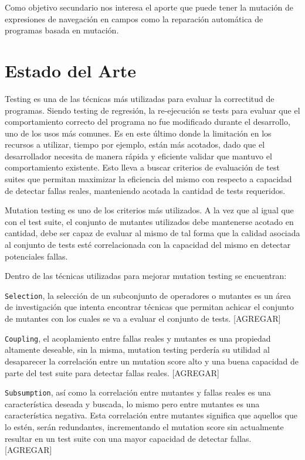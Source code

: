 Como objetivo secundario nos interesa el aporte que puede tener la mutaci\'on de expresiones de navegaci\'on en campos como la reparaci\'on autom\'atica de programas basada en mutaci\'on.


\section{Estado del Arte}
\label{sec:intro.estado-del-arte}

Testing es una de las t\'ecnicas m\'as utilizadas para evaluar la correctitud de programas. Siendo testing de regresi\'on, la re-ejecuci\'on se tests para evaluar que el comportamiento correcto del programa no fue modificado durante el desarrollo, uno de los usos m\'as comunes. Es en este \'ultimo donde la limitaci\'on en los recursos a utilizar, tiempo por ejemplo, est\'an m\'as acotados, dado que el desarrollador necesita de manera r\'apida y eficiente validar que mantuvo el comportamiento existente. Esto lleva a buscar criterios de evaluaci\'on de test suites que permitan maximizar la eficiencia del mismo con respecto a capacidad de detectar fallas reales, manteniendo acotada la cantidad de tests requeridos.

Mutation testing es uno de los criterios m\'as utilizados. A la vez que al igual que con el test suite, el conjunto de mutantes utilizados debe mantenerse acotado en cantidad, debe ser capaz de evaluar al mismo de tal forma que la calidad asociada al conjunto de tests est\'e correlacionada con la capacidad del mismo en detectar potenciales fallas.

Dentro de las t\'ecnicas utilizadas para mejorar mutation testing se encuentran:

\texttt{Selection}, la selecci\'on de un subconjunto de operadores o mutantes es un \'area de investigaci\'on que intenta encontrar t\'ecnicas que permitan achicar el conjunto de mutantes con los cuales se va a evaluar el conjunto de tests. [AGREGAR]

\texttt{Coupling}, el acoplamiento entre fallas reales y mutantes es una propiedad altamente deseable, sin la misma, mutation testing perder\'ia su utilidad al desaparecer la correlaci\'on entre un mutation score alto y una buena capacidad de parte del test suite para detectar fallas reales. [AGREGAR]

\texttt{Subsumption}, as\'i como la correlaci\'on entre mutantes y fallas reales es una caracter\'istica deseada y buscada, lo mismo pero entre mutantes es una caracter\'istica negativa. Esta correlaci\'on entre mutantes significa que aquellos que lo est\'en, ser\'an redundantes, incrementando el mutation score sin actualmente resultar en un test suite con una mayor capacidad de detectar fallas. [AGREGAR]

